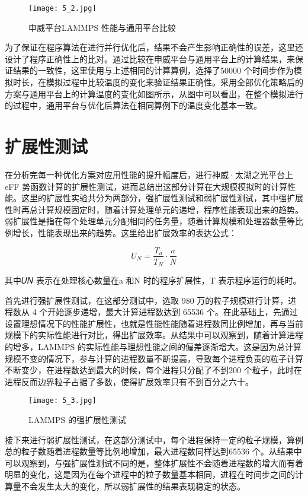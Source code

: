  \begin{figure}[h]
  \centering
  \texttt{[image: 5\_2.jpg]}
  \caption{申威平台LAMMPS 性能与通用平台比较}
  \label{fig:badge}
\end{figure}

为了保证在程序算法在进行并行优化后，结果不会产生影响正确性的误差，这里还设计了程序正确性上的比对。通过比较在申威平台与通用平台上的计算结果，来保证结果的一致性，这里使用与上述相同的计算算例，选择了50000 个时间步作为模拟时长，在模拟过程中比较温度的变化来验证结果正确性。采用全部优化策略后的方案与通用平台上的计算温度的变化如图所示，从图中可以看出，在整个模拟进行的过程中，通用平台与优化后算法在相同算例下的温度变化基本一致。

\section{扩展性测试}
在分析完每一种优化方案对应用性能的提升幅度后，进行神威·太湖之光平台上 eFF 势函数计算的扩展性测试，进而总结出这部分计算在大规模模拟时的计算性能。这里的扩展性实验共分为两部分，强扩展性测试和弱扩展性测试，其中强扩展性时再总计算规模固定时，随着计算处理单元的递增，程序性能表现出来的趋势。弱扩展性是指在每个处理单元分配相同的任务量，随着计算规模和处理器数量等比例增长，性能表现出来的趋势。这里给出扩展效率的表达公式：

\begin{equation}
  U_N=\frac{T_a}{T_N}\cdot \frac{a}{N}
\end{equation}

其中𝑈𝑁 表示在处理核心数量在a 和N 时的程序扩展性，T 表示程序运行的耗时。

首先进行强扩展性测试，在这部分测试中，选取 980 万的粒子规模进行计算，进程数从 4 个开始逐步递增，最大计算进程数达到 65536 个。在此基础上，先通过设置理想情况下的性能扩展性，也就是性能性能随着进程数同比例增加，再与当前规模下的实际性能进行对比，得出扩展效率。从结果中可以观察到，随着计算进程的增多，LAMMPS 的实际性能与理想性能之间的偏差逐渐增大。这是因为总计算规模不变的情况下，参与计算的进程数量不断提高，导致每个进程负责的粒子计算不断变少，在进程数达到最大的时候，每个进程只分配了不到200 个粒子，此时在进程反而边界粒子占据了多数，使得扩展效率只有不到百分之六十。

 \begin{figure}[h]
  \centering
  \texttt{[image: 5\_3.jpg]}
  \caption{LAMMPS 的强扩展性测试}
  \label{fig:badge}
\end{figure}

接下来进行弱扩展性测试，在这部分测试中，每个进程保持一定的粒子规模，算例总的粒子数随着进程数量等比例地增加，最大进程数同样达到65536 个。从结果中可以观察到，与强扩展性测试不同的是，整体扩展性不会随着进程数的增大而有着明显的变化，这是因为在每个进程中的粒子数量基本相同，进程在时间步之间的计算量不会发生太大的变化，所以弱扩展性的结果表现稳定的状态。

